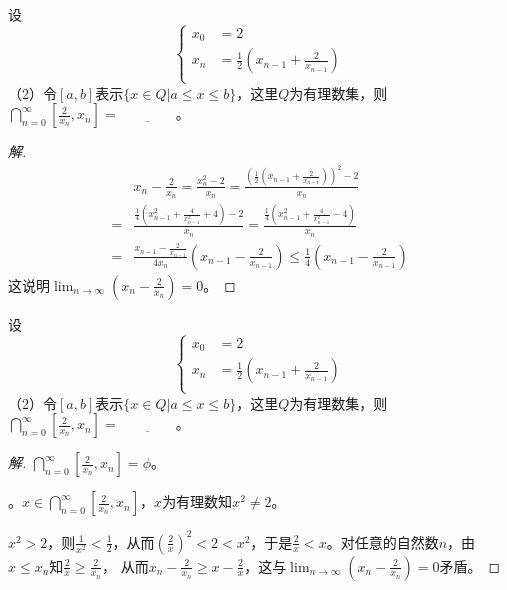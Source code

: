 \documentclass{beamer}
\begin{document}
\begin{CJK*}{UTF8}{gbsn}
\begin{frame}[t]
\end{frame}
\begin{frame}[t]
  \begin{Exercise}
    设\[
    \begin{cases}
      x_0&=2\\
      x_n&=\frac{1}{2}(x_{n-1}+\frac{2}{x_{n-1}})\\
    \end{cases}
    \]
  （2）令$[a,b]$表示$\{x\in Q|a\leq x \leq b\}$，这里$Q$为有理数集，则$\bigcap_{n=0}^{\infty}[\frac{2}{x_n},x_n]=\underline{\quad\quad\quad\quad}$。
  \end{Exercise}
  \begin{proof}[解]\vspace{-1cm}
    \begin{align*}
      &x_n-\frac{2}{x_n}=\frac{x_n^2-2}{x_n}=\frac{(\frac{1}{2}(x_{n-1}+\frac{2}{x_{n-1}}))^2-2}{x_n}\\
    =&\frac{\frac{1}{4}(x_{n-1}^2+\frac{4}{x_{n-1}^2}+4)-2}{x_n}=\frac{\frac{1}{4}(x_{n-1}^2+\frac{4}{x_{n-1}^2}-4)}{x_n}\\
    =&\frac{x_{n-1}-\frac{2}{x_{n-1}}}{4x_n}(x_{n-1}-\frac{2}{x_{n-1}})\leq \frac{1}{4}(x_{n-1}-\frac{2}{x_{n-1}})
    \end{align*} 
    这说明$\lim_{n\to\infty}(x_n-\frac{2}{x_n})=0$。
\end{proof}
\end{frame}
\begin{frame}[t]
  \begin{Exercise}
    设\[
    \begin{cases}
      x_0&=2\\
      x_n&=\frac{1}{2}(x_{n-1}+\frac{2}{x_{n-1}})\\
    \end{cases}
    \]
  （2）令$[a,b]$表示$\{x\in Q|a\leq x \leq b\}$，这里$Q$为有理数集，则$\bigcap_{n=0}^{\infty}[\frac{2}{x_n},x_n]=\underline{\quad\quad\quad\quad}$。
  \end{Exercise}
  \begin{proof}[解]\justifying\let\raggedright\justifying
    $\bigcap_{n=0}^{\infty}[\frac{2}{x_n},x_n]=\phi$。

    。$x\in \bigcap_{n=0}^{\infty}[\frac{2}{x_n},x_n]$，$x$为有理数知$x^2\neq 2$。
    
    $x^2>2$，则$\frac{1}{x^2}<\frac{1}{2}$，从而$(\frac{2}{x})^2<2<x^2$，于是$\frac{2}{x}<x$。对任意的自然数$n$，由$x\leq x_n$知$\frac{2}{x}\geq \frac{2}{x_n}$，
    从而$x_n-\frac{2}{x_n}\geq x-\frac{2}{x}$，这与$\lim_{n\to\infty}(x_n-\frac{2}{x_n})=0$矛盾。
    

\end{proof}
\end{frame}
\end{CJK*}
\end{document}
